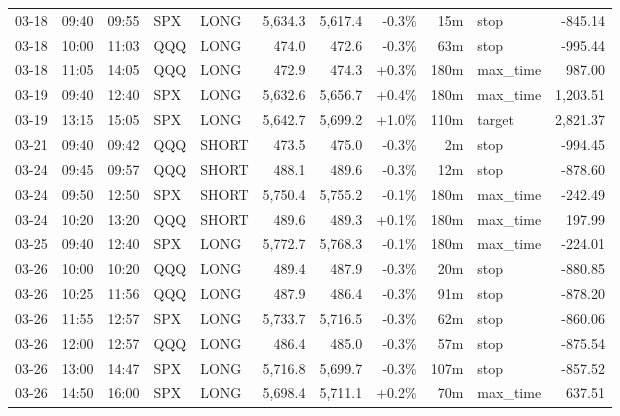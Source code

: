 \documentclass[11pt,a4paper,twoside]{article}
\begin{document}
\begin{center}
\begin{longtable}{>{\color{txtmain}}l l l l l r r r r >{\color{txtmain}}l r}
03-18 & 09:40 & 09:55 & SPX & LONG & 5,634.3 & 5,617.4 & \textcolor{lossred}{-0.3\%} & 15m & stop & \textcolor{lossred}{-845.14} \\
03-18 & 10:00 & 11:03 & QQQ & LONG & 474.0 & 472.6 & \textcolor{lossred}{-0.3\%} & 63m & stop & \textcolor{lossred}{-995.44} \\
03-18 & 11:05 & 14:05 & QQQ & LONG & 472.9 & 474.3 & \textcolor{wingreen}{+0.3\%} & 180m & max\_time & \textcolor{wingreen}{987.00} \\
03-19 & 09:40 & 12:40 & SPX & LONG & 5,632.6 & 5,656.7 & \textcolor{wingreen}{+0.4\%} & 180m & max\_time & \textcolor{wingreen}{1,203.51} \\
03-19 & 13:15 & 15:05 & SPX & LONG & 5,642.7 & 5,699.2 & \textcolor{wingreen}{+1.0\%} & 110m & target & \textcolor{wingreen}{2,821.37} \\
03-21 & 09:40 & 09:42 & QQQ & SHORT & 473.5 & 475.0 & \textcolor{lossred}{-0.3\%} & 2m & stop & \textcolor{lossred}{-994.45} \\
03-24 & 09:45 & 09:57 & QQQ & SHORT & 488.1 & 489.6 & \textcolor{lossred}{-0.3\%} & 12m & stop & \textcolor{lossred}{-878.60} \\
03-24 & 09:50 & 12:50 & SPX & SHORT & 5,750.4 & 5,755.2 & \textcolor{lossred}{-0.1\%} & 180m & max\_time & \textcolor{lossred}{-242.49} \\
03-24 & 10:20 & 13:20 & QQQ & SHORT & 489.6 & 489.3 & \textcolor{wingreen}{+0.1\%} & 180m & max\_time & \textcolor{wingreen}{197.99} \\
03-25 & 09:40 & 12:40 & SPX & LONG & 5,772.7 & 5,768.3 & \textcolor{lossred}{-0.1\%} & 180m & max\_time & \textcolor{lossred}{-224.01} \\
03-26 & 10:00 & 10:20 & QQQ & LONG & 489.4 & 487.9 & \textcolor{lossred}{-0.3\%} & 20m & stop & \textcolor{lossred}{-880.85} \\
03-26 & 10:25 & 11:56 & QQQ & LONG & 487.9 & 486.4 & \textcolor{lossred}{-0.3\%} & 91m & stop & \textcolor{lossred}{-878.20} \\
03-26 & 11:55 & 12:57 & SPX & LONG & 5,733.7 & 5,716.5 & \textcolor{lossred}{-0.3\%} & 62m & stop & \textcolor{lossred}{-860.06} \\
03-26 & 12:00 & 12:57 & QQQ & LONG & 486.4 & 485.0 & \textcolor{lossred}{-0.3\%} & 57m & stop & \textcolor{lossred}{-875.54} \\
03-26 & 13:00 & 14:47 & SPX & LONG & 5,716.8 & 5,699.7 & \textcolor{lossred}{-0.3\%} & 107m & stop & \textcolor{lossred}{-857.52} \\
03-26 & 14:50 & 16:00 & SPX & LONG & 5,698.4 & 5,711.1 & \textcolor{wingreen}{+0.2\%} & 70m & max\_time & \textcolor{wingreen}{637.51} \\

\end{longtable}
\end{center}
\end{document}
